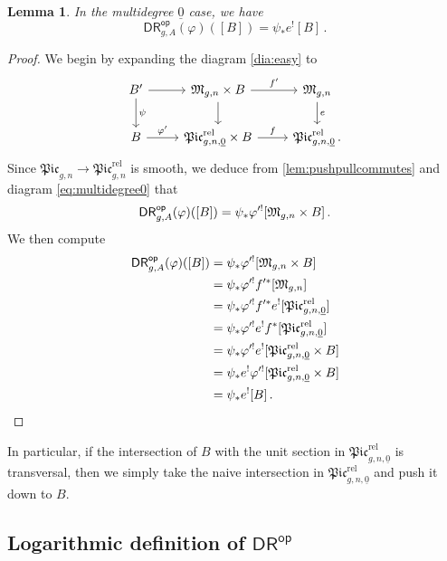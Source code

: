 \documentclass[a4paper,12pt]{article} %
\newcommand{\ul}[1]{{\underline{#1}}}
\theoremstyle{definition}
\theoremstyle{plain}%
\newtheorem{lemma}[definition]{Lemma}
\renewcommand{\phi}{\varphi}
\newcommand{\Picabs}{\mathfrak{Pic}}
\newcommand{\Picrel}{\mathfrak{Pic}^{\mathrm{rel}}}
\newcommand{\DRop}{\mathsf{DR}^{\mathsf{op}}}
\begin{document}
\begin{lemma} In the multidegree $\ul 0$ case, we have
\begin{equation}
    \DRop_{g,A}(\phi)([B]) = \psi_*e^![B]\, .
\end{equation}
\end{lemma}
\begin{proof}
We begin by expanding the diagram \cref{dia:easy} to
\begin{equation}
    \begin{tikzcd}
    B' \arrow[r] \arrow[d,"\psi"] & \frak M_{g,n} \times B \arrow[r,"f'"] \arrow[d] & \frak M_{g,n}\arrow[d, "e"]\\
    B \arrow[r, "\phi' "]& \Picrel_{g,n,\ul 0} \times B \arrow[r,"f"] & \Picrel_{g,n,\ul 0}\, . 
    \end{tikzcd}
\end{equation}
Since $\Picabs_{g,n} \to \Picrel_{g,n}$ is smooth, we deduce from \cref{lem:pushpullcommutes} and  diagram \cref{eq:multidegree0} that 
\begin{equation}
    \DRop_{g,A}(\phi)([B]) = \psi_*\phi'^![\frak M_{g,n} \times B]\, .
\end{equation}
We then compute
\begin{equation}
    \begin{split}
        \DRop_{g,A}(\phi)([B]) & = \psi_*\phi'^![\frak M_{g,n} \times B]\\
        & = \psi_*\phi'^! f'^*[\frak M_{g,n}]\\
        & = \psi_*\phi'^! f'^*e^![\Picrel_{g,n,\ul 0}]\\
        & = \psi_*\phi'^! e^! f^*[\Picrel_{g,n,\ul 0}]\\
        & = \psi_*\phi'^! e^! [\Picrel_{g,n,\ul 0}\times B]\\
        & = \psi_*e^! \phi'^!  [\Picrel_{g,n,\ul 0}\times B]\\
        & = \psi_*e^! [B]\, . \\
    \end{split}
\end{equation}
\end{proof}
In particular, if the intersection of $B$ with the unit section in $\Picrel_{g,n,\ul 0}$ is transversal, then we simply take the naive intersection in $\Picrel_{g,n,\ul 0}$ and push it down to $B$. 


\subsection{Logarithmic definition of \texorpdfstring{$\DRop$}{DR\^{}op}}\label{sec:log_def}
\end{document}
